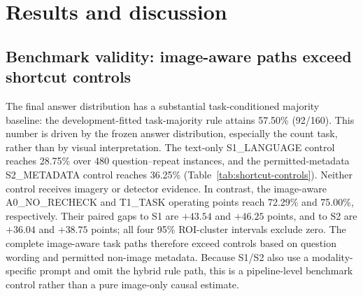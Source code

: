 \section{Results and discussion}
\label{sec:results}

\subsection{Benchmark validity: image-aware paths exceed shortcut controls}
The final answer distribution has a substantial task-conditioned majority baseline: the development-fitted task-majority rule attains 57.50\% (92/160). This number is driven by the frozen answer distribution, especially the count task, rather than by visual interpretation. The text-only S1\_LANGUAGE control reaches 28.75\% over 480 question--repeat instances, and the permitted-metadata S2\_METADATA control reaches 36.25\% (Table~\ref{tab:shortcut-controls}). Neither control receives imagery or detector evidence. In contrast, the image-aware A0\_NO\_RECHECK and T1\_TASK operating points reach 72.29\% and 75.00\%, respectively. Their paired gaps to S1 are $+43.54$ and $+46.25$ points, and to S2 are $+36.04$ and $+38.75$ points; all four 95\% ROI-cluster intervals exclude zero. The complete image-aware task paths therefore exceed controls based on question wording and permitted non-image metadata. Because S1/S2 also use a modality-specific prompt and omit the hybrid rule path, this is a pipeline-level benchmark control rather than a pure image-only causal estimate.

\begin{table}[!t]
\centering\small
\caption{Shortcut controls and image-aware operating points on the frozen final set. S0 uses a development-fitted task majority and is deterministic ($n=160$); all other rows use three aligned repeats ($n=480$). S1 receives question text, choices, and task type; S2 additionally receives permitted runtime metadata.}
\label{tab:shortcut-controls}
\end{table}

